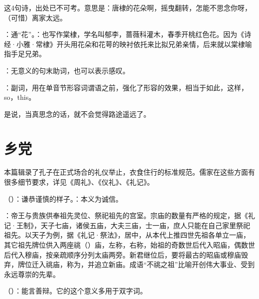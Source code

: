 {
\item {}这4句诗，出处已不可考。意思是：唐棣的花朵啊，摇曳翻转，怎能不思念你呀，（可惜）离家太远。

：通“花”。：也写作棠棣，学名叫郁李，蔷薇科灌木，春季开桃红色花。因为《诗经·小雅·常棣》开头用花朵和花萼的映衬依托来比拟兄弟亲情，后来就以棠棣喻指手足兄弟。

：无意义的句末助词，也可以表示感叹。

：副词，用在单音节形容词谓语之前，强化了形容的效果，相当于如此，这样，so，this。


\item {}是说，当真思念的话，就不会觉得路途遥远了。
}
{}



\chapter{乡党}

本篇辑录了孔子在正式场合的礼仪举止，衣食住行的标准规范。儒家在这些方面有很多细节要求，详见《周礼》、《仪礼》、《礼记》。%

\bigskip

{
\item {}（）：谦恭谨慎的样子。：本义为诚信。
\item {}：帝王与贵族供奉祖先灵位、祭祀祖先的宫室。宗庙的数量有严格的规定，据《礼记·王制》，天子七庙，诸侯五庙，大夫三庙，士一庙，庶人只能在自己家里祭祀祖先。以天子为例，据《礼记·祭法》，居中，从本代上推四世先祖各单立一庙，其它祖先牌位供入两座祧（）庙，左称，右称，始祖的奇数世后代入昭庙，偶数世后代入穆庙，按亲疏顺序分列太庙两旁。新君继位后，要将最古的昭庙或穆庙毁弃，牌位迁入祧庙，称为，并追立新庙。成语“不祧之祖”比喻开创伟大事业、受到永远尊崇的先辈。 %
\item {}（）：能言善辩。它的这个意义多用于双字词。
}
{}


